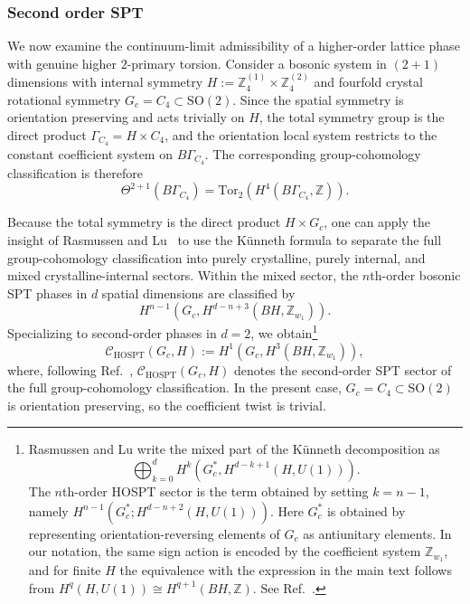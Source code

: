 \documentclass[aps,prx,reprint,superscriptaddress,twocolumn,amsmath,amssymb,amsfonts, nofootinbib]{revtex4-2}
\newcommand{\SO}{\text{SO}}
\theoremstyle{apsstyle}
\begin{document}
\subsubsection{Second order SPT}
\label{sec:example_2_highertorsion}


We now examine the continuum-limit admissibility of a higher-order lattice phase with genuine higher $2$-primary torsion. Consider a bosonic system in $(2+1)$ dimensions with internal symmetry
$H:=\mathbb Z_{4}^{(1)}\times\mathbb Z_{4}^{(2)}$ and fourfold crystal rotational symmetry $G_c=C_{4}\subset \SO(2)$. Since the spatial symmetry is orientation preserving and acts trivially on $H$, the total symmetry group is the direct product $\Gamma_{C_{4}}
=H\times C_{4}$, and the orientation local system restricts to the constant coefficient system on $B\Gamma_{C_{4}}$. The corresponding group-cohomology classification is therefore  
\begin{equation}
\Theta^{2+1}(B\Gamma_{C_{4}})
=
\mathrm{Tor}_{2}
\left(
H^{4}(B\Gamma_{C_{4}},\mathbb Z)
\right).
\end{equation}

Because the total symmetry is the direct product $H\times G_c$, one can apply the insight of Rasmussen and Lu~\cite{Rasmussen2020} to use the K\"unneth formula to separate the full group-cohomology classification into purely crystalline, purely internal, and mixed crystalline-internal sectors. Within the mixed sector, the $n$th-order bosonic SPT phases in $d$ spatial dimensions are classified by
\begin{equation*}
H^{n-1}\left( G_c, H^{d-n+3}(BH,\mathbb Z_{w_1}) \right).
\end{equation*}
Specializing to second-order phases in $d=2$, we obtain\footnote{Rasmussen and Lu write the mixed part of the K\"unneth decomposition as
\begin{equation*}
\bigoplus_{k=0}^{d} H^{k}\left( G_c^{*}, H^{d-k+1}(H,U(1)) \right).
\end{equation*}
The $n$th-order HOSPT sector is the term obtained by setting $k=n-1$, namely $H^{n-1}\left(G_c^{*};H^{d-n+2}(H,U(1))\right)$. Here $G_c^{*}$ is obtained by representing orientation-reversing elements of $G_c$ as antiunitary elements. In our notation, the same sign action is encoded by the coefficient system $\mathbb Z_{w_1}$, and for finite $H$ the equivalence with the expression in the main text follows from $H^{q}(H,U(1))\cong H^{q+1}(BH,\mathbb Z)$. See Ref.~\cite{Rasmussen2020}.}
\begin{equation}
\mathcal C_{\mathrm{HOSPT}}(G_c,H) := H^{1}\left( G_c, H^{3}(BH,\mathbb Z_{w_1}) \right),
\label{eq:HOSPT_general_classification}
\end{equation}
where, following Ref.~\cite{Rasmussen2020}, $\mathcal C_{\mathrm{HOSPT}}(G_c,H)$ denotes the second-order SPT sector of the full group-cohomology classification. In the present case, $G_c=C_4\subset\SO(2)$ is orientation preserving, so the coefficient twist is trivial.
\end{document}
